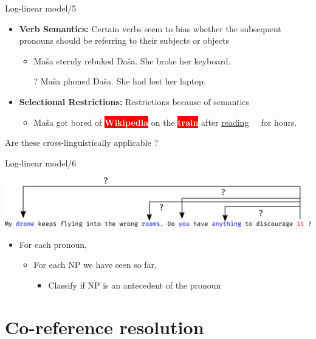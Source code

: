 \documentclass[dvipsnames, 10pt, compress]{beamer}
\newcommand{\redfillbox}[1]{\colorbox{red}{\textcolor{white}{{\bf #1}}}}
\newcommand{\bluefillbox}[1]{\colorbox{ProcessBlue}{\textcolor{white}{{\bf #1}}}}
\begin{document}
\begin{frame}{Log-linear model/5}

\begin{itemize}
 \item \textbf{Verb Semantics:} Certain verbs seem to bias whether 
the subsequent pronouns should be referring to their 
subjects or objects 
 \begin{itemize}
   \item Maša sternly rebuked Daša. She broke her keyboard.
   \item[?] Maša phoned Daša. She had lost her laptop.
 \end{itemize}
 \item \textbf{Selectional Restrictions:} Restrictions because of 
semantics 
 \begin{itemize}
   \item Maša got bored of \redfillbox{Wikipedia} on the \redfillbox{train} after \underline{reading} \bluefillbox{it} for hours. 
 \end{itemize}
\end{itemize}

Are these cross-linguistically applicable ? 

\end{frame}

\begin{frame}{Log-linear model/6} %

\includegraphics[width=\textwidth]{graphics/classifier-coref-2.eps}

\begin{itemize}
  \item For each pronoun,
  \begin{itemize}
     \item For each NP we have seen so far,
     \begin{itemize}
       \item Classify if NP is an antecedent of the pronoun
     \end{itemize}
  \end{itemize}
\end{itemize}


\end{frame}

\section{Co-reference resolution}
\end{document}
